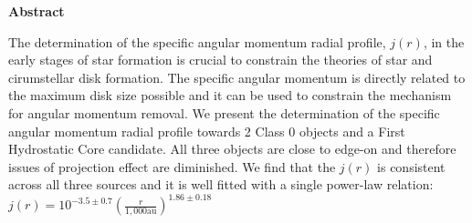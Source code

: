 \textbf{Abstract}

The determination of the specific angular momentum radial profile, $j(r)$, in the early stages of star formation is crucial to constrain the theories of star and cirumstellar disk formation.
The specific angular momentum is directly related to the maximum disk size possible and 
it can be used to constrain the mechanism for angular momentum removal. 
We present the determination of the specific angular momentum radial profile towards 2 Class 0 objects and a First Hydrostatic Core candidate. 
All three objects are close to edge-on and therefore issues of projection effect are diminished. 
We find that the $j(r)$ is consistent across all three sources and it is well fitted with a single power-law relation: 
$j(r) = 10^{-3.5\pm 0.7}\left( \frac{r}{1,000 \textrm{au}}\right)^{1.86\pm0.18}$%
  